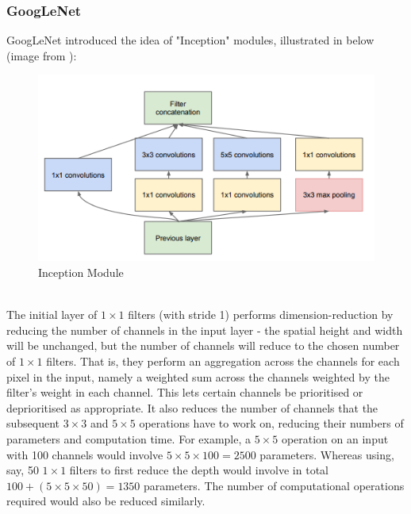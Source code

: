 \documentclass[11pt]{article} %
\theoremstyle{plain}
\theoremstyle{definition}
\begin{document}
\subsubsection{GoogLeNet}
GoogLeNet \cite{GoogLeNet_Paper} introduced the idea of "Inception" modules, illustrated in  below (image from \cite{GoogLeNet_Paper}):
\begin{figure}[!ht]
  \centering    
  \caption{Inception Module}
  \label{fig:Inception_Module}
  \includegraphics[scale=0.7]{InceptionModule.PNG}
\end{figure}
\\
\noindent
The initial layer of \(1 \times 1\) filters (with stride 1) performs dimension-reduction by reducing the number of channels in the input layer - the spatial height and width will be unchanged, but the number of channels will reduce to the chosen number of \(1 \times 1\) filters. That is, they perform an aggregation across the channels for each pixel in the input, namely a weighted sum across the channels weighted by the filter's weight in each channel. This lets certain channels be prioritised or deprioritised as appropriate. It also reduces the number of channels that the subsequent \(3 \times 3\) and \(5 \times 5\) operations have to work on, reducing their numbers of parameters and computation time. For example, a \(5 \times 5\) operation on an input with 100 channels would involve \(5 \times 5 \times 100 = 2500\) parameters. Whereas using, say, 50 \(1 \times 1\) filters to first reduce the depth would involve in total \(100 + (5 \times 5 \times 50) = 1350\) parameters. The number of computational operations required would also be reduced similarly.
\\
\\
\noindent
\end{document}
